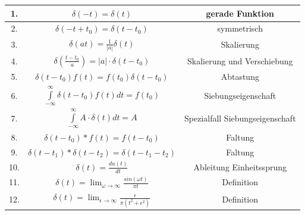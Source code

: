 \begin{multicols}{2}
{\begin{tabular}{ccc}
      \hline
      1.  & $\delta(-t) = \delta(t) $                                                                                            & gerade Funktion                        \\
      \hline
      2.  & $\delta(-t+t_0) = \delta(t-t_0)$                                                                                     & symmetrisch                            \\
      \hline
      3.  & $\delta(at)= \frac{1}{|a|}\delta(t)$                                                                                 & Skalierung                             \\
      \hline
      4.  & $\delta(\frac{t-t_0}{a}) = |a| \cdot \delta(t-t_0)$                                                                  & Skalierung und Verschiebung            \\
      \hline
      5.  & $\delta(t-t_0)f(t) = f(t_0)\delta(t-t_0)$                                                                            & Abtastung                              \\
      \hline
      6.  & $\int \limits _{-\infty} ^{\infty} \delta(t-t_0)f(t)dt = f(t_0)$                                                     & Siebungseigenschaft                    \\
      \hline
      7.  & $\int \limits _{-\infty} ^{\infty}  A\cdot \delta(t)dt = A$                                                          & Spezialfall Siebungseigenschaft        \\
      \hline
      8.  & $\delta(t-t_0) * f(t) = f(t-t_0)$                                                                                    & Faltung                                \\
      \hline
      9.  & $\delta(t-t_1) * \delta(t-t_2) = \delta(t-t_1-t_2)$                                                                  & Faltung                                \\
      \hline
      10. & $\delta(t) = \frac{du(t)}{dt}$                                                                                       & Ableitung Einheitssprung               \\
      \hline
      11. & $ \delta(t) = \lim _{\omega \to \infty} \frac{sin(\omega t)}{\pi t} $                                                & Definition                             \\
      \hline
      12. & $ \delta(t) = \lim _{\epsilon \to \infty} \frac{\epsilon}{\pi(t^2 + \epsilon^2)} $                                   & Definition                             \\

\end{tabular}}
\end{multicols}
